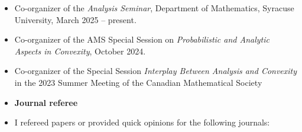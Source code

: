 \documentclass[12pt]{article}
\theoremstyle{plain} \numberwithin{equation}{section}
\theoremstyle{definition}
\newcounter{list}
\begin{document}
\begin{itemize}
	In recent years, there has been a nationwide trend of more students struggling with calculus courses because of weak backgrounds in algebra. The literature shows that a remedial prerequisite course in algebra may not be particularly effective.

	This workshop is designed to provide students enrolled in MAT-295 Calculus I at Syracuse University with \emph{just-in-time} algebra support. The goal is to help students review the algebra skills they will use in the next calculus lecture. The workshop is co-organized by the Calculus coordinator and me, led by an undergraduate student, and funded by my NSF CAREER grant.

	\item Co-organizer of the \emph{Analysis Seminar}, Department of Mathematics, Syracuse University, March 2025 -- present.

	\item Co-organizer of the AMS Special Session on \emph{Probabilistic and Analytic Aspects in Convexity}, October 2024.
	\item Co-organizer of the Special Session \emph{Interplay Between Analysis and Convexity} in the 2023 Summer Meeting of the Canadian Mathematical Society


		\item[] \textbf{Journal referee}
		\item[]I refereed papers or provided quick opinions for the following journals:

		\vskip 0.1in


\end{itemize}
\end{document}
